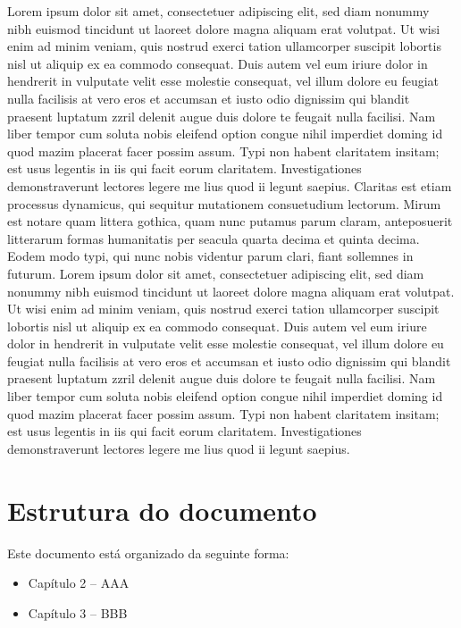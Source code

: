 Lorem ipsum dolor sit amet, consectetuer adipiscing elit, sed diam nonummy nibh euismod tincidunt ut laoreet dolore magna aliquam erat volutpat. Ut wisi enim ad minim veniam, quis nostrud exerci tation ullamcorper suscipit lobortis nisl ut aliquip ex ea commodo consequat. Duis autem vel eum iriure dolor in hendrerit in vulputate velit esse molestie consequat, vel illum dolore eu feugiat nulla facilisis at vero eros et accumsan et iusto odio dignissim qui blandit praesent luptatum zzril delenit augue duis dolore te feugait nulla facilisi. Nam liber tempor cum soluta nobis eleifend option congue nihil imperdiet doming id quod mazim placerat facer possim assum. Typi non habent claritatem insitam; est usus legentis in iis qui facit eorum claritatem. Investigationes demonstraverunt lectores legere me lius quod ii legunt saepius. Claritas est etiam processus dynamicus, qui sequitur mutationem consuetudium lectorum. Mirum est notare quam littera gothica, quam nunc putamus parum claram, anteposuerit litterarum formas humanitatis per seacula quarta decima et quinta decima. Eodem modo typi, qui nunc nobis videntur parum clari, fiant sollemnes in futurum. Lorem ipsum dolor sit amet, consectetuer adipiscing elit, sed diam nonummy nibh euismod tincidunt ut laoreet dolore magna aliquam erat volutpat. Ut wisi enim ad minim veniam, quis nostrud exerci tation ullamcorper suscipit lobortis nisl ut aliquip ex ea commodo consequat. Duis autem vel eum iriure dolor in hendrerit in vulputate velit esse molestie consequat, vel illum dolore eu feugiat nulla facilisis at vero eros et accumsan et iusto odio dignissim qui blandit praesent luptatum zzril delenit augue duis dolore te feugait nulla facilisi. Nam liber tempor cum soluta nobis eleifend option congue nihil imperdiet doming id quod mazim placerat facer possim assum. Typi non habent claritatem insitam; est usus legentis in iis qui facit eorum claritatem. Investigationes demonstraverunt lectores legere me lius quod ii legunt saepius.

\section{Estrutura do documento}

Este documento está organizado da seguinte forma:
\begin{itemize}
\item Capítulo 2 – AAA
\item Capítulo 3 – BBB
\end{itemize}

